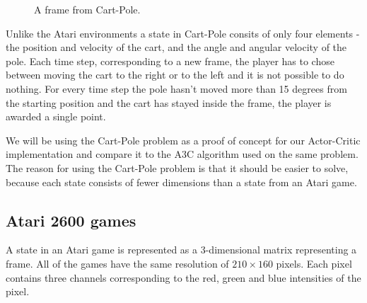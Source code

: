 \documentclass[11pt]{article}
\begin{document}
\begin{figure}[!h]
    \centering
    \caption{A frame from Cart-Pole.}
    \label{fig:cartpole}
\end{figure}

Unlike the Atari environments a state in Cart-Pole consits of only four elements - the position and velocity of the cart, and the
angle and angular velocity of the pole.
Each time step, corresponding to a new frame, the player has to chose between moving the cart to the right or to the left and it is not possible
to do nothing.
For every time step the pole hasn't moved more than 15 degrees from the starting position and
the cart has stayed inside the frame, the player is awarded a single point.

We will be using the Cart-Pole problem as a proof of concept for our Actor-Critic implementation and
compare it to the A3C algorithm used on the same problem.
The reason for using the Cart-Pole problem is that it should be easier
to solve, because each state consists of fewer dimensions than a state
from an Atari game.


\subsection{Atari 2600 games}\label{sec:atari}

A state in an Atari game is represented as a 3-dimensional matrix representing a
frame.
All of the games have the same resolution of $210 \times 160$ pixels.
Each pixel contains three channels corresponding to the red, green and blue intensities of the pixel.
\end{document}

